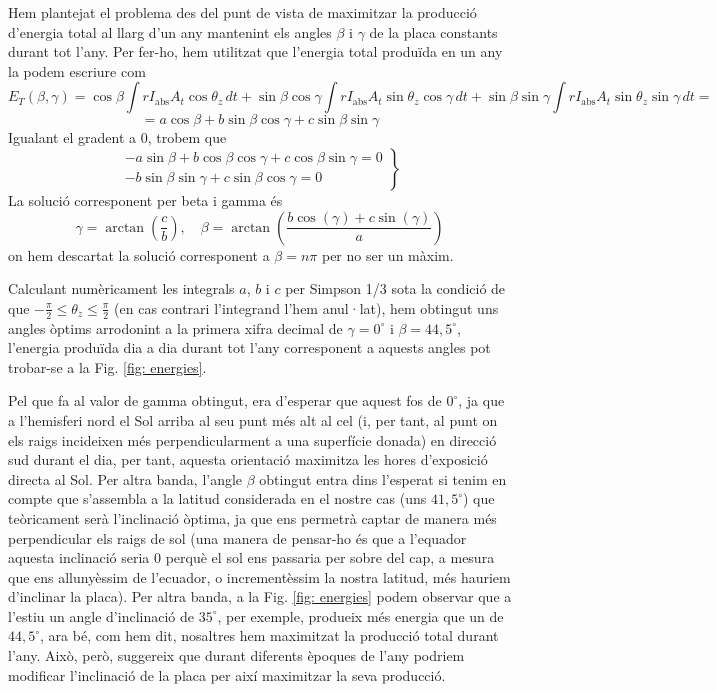 \documentclass[11pt]{article}
\begin{document}
Hem plantejat el problema des del punt de vista de maximitzar la producció d'energia total al llarg d'un any mantenint els angles $\beta$ i $\gamma$ de la placa constants durant tot l'any. Per fer-ho, hem utilitzat que l'energia total produïda en un any la podem escriure com
\[
E_T(\beta, \gamma) = \cos \beta \int r I_{\text{abs}} A_{t} \cos \theta_{z} \, dt
+ \sin \beta \cos \gamma \int r I_{\text{abs}} A_{t} \sin \theta_{z} \cos \gamma \, dt
+ \sin \beta \sin \gamma \int r I_{\text{abs}} A_{t} \sin \theta_{z} \sin \gamma \, dt=
\]
\[
= a\cos \beta
+ b\sin \beta \cos \gamma
+ c\sin \beta \sin \gamma
\]
Igualant el gradent a 0, trobem que
\[
\left.
\begin{aligned}
-a\sin \beta + b\cos \beta \cos \gamma + c\cos \beta \sin \gamma = 0 \\
-b\sin \beta \sin \gamma + c\sin \beta \cos \gamma = 0
\end{aligned}
\right\}
\]
La solució corresponent per beta i gamma és
\[
\gamma = \arctan\left(\frac{c}{b}\right), \quad \beta = \arctan\left(\frac{b \cos(\gamma) + c \sin(\gamma)}{a}\right)
\]
on hem descartat la solució corresponent a $\beta=n\pi$ per no ser un màxim.

Calculant numèricament les integrals $a$, $b$ i $c$ per Simpson 1/3 sota la condició de que $-\frac{\pi}{2} \leq \theta_z \leq \frac{\pi}{2}$ (en cas contrari l'integrand l'hem anul·lat), hem obtingut uns angles òptims arrodonint a la primera xifra decimal de $\gamma=0^\circ$ i $\beta=44,5^\circ$, l'energia produïda dia a dia durant tot l'any corresponent a aquests angles pot trobar-se a la Fig. \ref{fig: energies}. 

Pel que fa al valor de gamma obtingut, era d'esperar que aquest fos de $0^\circ$, ja que a l'hemisferi nord el Sol arriba al seu punt més alt al cel (i, per tant, al punt on els raigs incideixen més perpendicularment a una superfície donada) en direcció sud durant el dia, per tant, aquesta orientació maximitza les hores d'exposició directa al Sol. Per altra banda, l'angle $\beta$ obtingut entra dins l'esperat si tenim en compte que s'assembla a la latitud considerada en el nostre cas (uns $41,5^\circ$) que teòricament serà l'inclinació òptima, ja que ens permetrà captar de manera més perpendicular els raigs de sol (una manera de pensar-ho és que a l'equador aquesta inclinació seria 0 perquè el sol ens passaria per sobre del cap, a mesura que ens allunyèssim de l'ecuador, o incrementèssim la nostra latitud, més hauriem d'inclinar la placa). Per altra banda, a la Fig. \ref{fig: energies} podem observar que a l'estiu un angle d'inclinació de $35^\circ$, per exemple, produeix més energia que un de $44,5^\circ$, ara bé, com hem dit, nosaltres hem maximitzat la producció total durant l'any. Això, però, suggereix que durant diferents èpoques de l'any podriem modificar l'inclinació de la placa per així maximitzar la seva producció.
\end{document}
